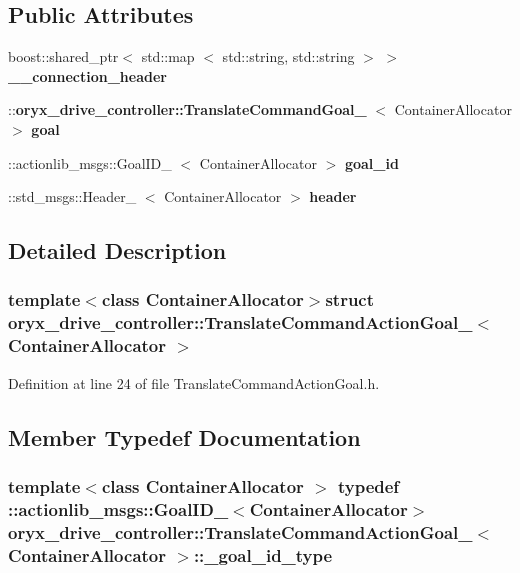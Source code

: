 \subsection*{\-Public \-Attributes}
\begin{DoxyCompactItemize}
\item 
boost\-::shared\-\_\-ptr$<$ std\-::map\*
$<$ std\-::string, std\-::string $>$ $>$ {\bf \-\_\-\-\_\-connection\-\_\-header}
\item 
\-::{\bf oryx\-\_\-drive\-\_\-controller\-::\-Translate\-Command\-Goal\-\_\-}\*
$<$ \-Container\-Allocator $>$ {\bf goal}
\item 
\-::actionlib\-\_\-msgs\-::\-Goal\-I\-D\-\_\-\*
$<$ \-Container\-Allocator $>$ {\bf goal\-\_\-id}
\item 
\-::std\-\_\-msgs\-::\-Header\-\_\-\*
$<$ \-Container\-Allocator $>$ {\bf header}
\end{DoxyCompactItemize}


\subsection{\-Detailed \-Description}
\subsubsection*{template$<$class Container\-Allocator$>$struct oryx\-\_\-drive\-\_\-controller\-::\-Translate\-Command\-Action\-Goal\-\_\-$<$ Container\-Allocator $>$}



\-Definition at line 24 of file \-Translate\-Command\-Action\-Goal.\-h.



\subsection{\-Member \-Typedef \-Documentation}
\subsubsection[{\-\_\-goal\-\_\-id\-\_\-type}]{\setlength{\rightskip}{0pt plus 5cm}template$<$class Container\-Allocator $>$ typedef \-::actionlib\-\_\-msgs\-::\-Goal\-I\-D\-\_\-$<$\-Container\-Allocator$>$ {\bf oryx\-\_\-drive\-\_\-controller\-::\-Translate\-Command\-Action\-Goal\-\_\-}$<$ \-Container\-Allocator $>$\-::{\bf \-\_\-goal\-\_\-id\-\_\-type}}\label{structoryx__drive__controller_1_1TranslateCommandActionGoal___adccce008196cc53b97f39cff84ba88a3}


